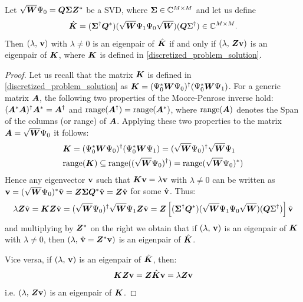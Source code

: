 \begin{prop}
Let $\sqrt{\vb*{W}}\Psi_0 = \vb*{Q}\vb*{\Sigma}\vb*{Z}^*$ be a SVD, where $\vb*{\Sigma}\in\mathbb{C}^{M\times M}$ and let us define
\begin{equation}
    \label{kedmd_matrix}
    \hat{\vb*{K}} = (\vb*{\Sigma}^{\dagger}\vb*{Q}^*)(\sqrt{\vb*{W}}\Psi_1\Psi_0\sqrt{\vb*{W}})(\vb*{Q}\Sigma^{\dagger})\in\mathbb{C}^{M \times M}.
\end{equation}
Then $(\lambda,\,\vb{v})$ with $\lambda\neq 0$ is an eigenpair of $\hat{\vb*{K}}$ if and only if $(\lambda,\,\vb*{Z}\vb{v})$ is an eigenpair of $\vb*{K}$, where $\vb*{K}$ is defined in \eqref{discretized_problem_solution}.
\end{prop}
\begin{proof}
Let us recall that the matrix $\vb*{K}$ is defined in \eqref{discretized_problem_solution} as $\vb*{K} = (\Psi_0^*\vb*{W}\Psi_0)^{\dagger}(\Psi_0^*\vb*{W}\Psi_1)$. For a generic matrix $\vb*{A}$, the following two properties of the Moore-Penrose inverse hold: $(\vb*{A}^*\vb*{A})^{\dagger}\vb*{A}^* = \vb*{A}^{\dagger}$ and $\mathrm{range}(\vb*{A}^{\dagger}) = \mathrm{range}(\vb*{A}^*)$, where $\mathrm{range}(\vb*{A})$ denotes the Span of the columns (or range) of $\vb*{A}$. Applying these two properties to the matrix $\vb*{A} = \sqrt{\vb*{W}}\Psi_0$ it follows: 
\begin{equation*}
    \begin{split}
        &\vb*{K} = (\Psi_0^*\vb*{W}\Psi_0)^{\dagger}(\Psi_0^*\vb*{W}\Psi_1) = (\sqrt{\vb*{W}}\Psi_0)^{\dagger} \sqrt{\vb*{W}}\Psi_1 \\
        &\mathrm{range}(\vb*{K}) \subseteq \mathrm{range}((\sqrt{\vb*{W}}\Psi_0)^{\dagger}) = \mathrm{range}(\sqrt{\vb*{W}}\Psi_0)^*)
    \end{split}
\end{equation*}
Hence any eigenvector $\vb{v}$ such that $\vb*{K}\vb{v} = \lambda \vb{v}$ with $\lambda \neq 0$ can be written as $\vb{v} = (\sqrt{\vb*{W}}\Psi_0)^*\tilde{\vb{v}} = \vb*{Z}\vb*{\Sigma}\vb*{Q}^*\tilde{\vb{v}} = \vb*{Z}\hat{\vb{v}}$ for some $\hat{\vb{v}}$. Thus:
\begin{equation*}
    \lambda \vb*{Z}\hat{\vb{v}} = \vb*{K}\vb*{Z}\hat{\vb{v}} = (\sqrt{\vb*{W}}\Psi_0)^{\dagger} \sqrt{\vb*{W}}\Psi_1 \vb*{Z}\hat{\vb{v}} = \vb*{Z}\left[(\vb*{\Sigma}^{\dagger}\vb*{Q}^*)(\sqrt{\vb*{W}}\Psi_1\Psi_0\sqrt{\vb*{W}})(\vb*{Q}\Sigma^{\dagger})\right] \hat{\vb{v}}
\end{equation*}
and multiplying by $\vb*{Z}^*$ on the right we obtain that if $(\lambda,\,\vb{v})$ is an eigenpair of $\vb*{K}$ with $\lambda\neq 0$, then $(\lambda,\,\hat{\vb{v}} = \vb*{Z}^*\vb{v})$ is an eigenpair of $\hat{\vb*{K}}$. 

Vice versa, if $(\lambda,\,\vb{v})$ is an eigenpair of $\hat{\vb*{K}}$, then:
\begin{equation*}
    \vb*{K}\vb*{Z}\vb{v} = \vb*{Z}\hat{\vb*{K}}\vb{v} = \lambda\vb*{Z}\vb{v}
\end{equation*}
i.e. $(\lambda,\,\vb*{Z}\vb{v})$ is an eigenpair of $\vb*{K}$.
\end{proof}

